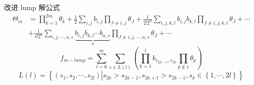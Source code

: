 \documentclass[handout]{beamer}
\newcommand{\sbrace}[1]{\left(#1\right)}
\newcommand{\bbrace}[1]{\left\{#1\right\}}
\begin{document}
\begin{frame}{改进 lump 解公式}
\begin{equation}
\begin{aligned}
\Theta_m&=\prod_{k=1}^{2m}\theta_k+\frac{1}{2}\sum_{i,j}{b_{i,j}}\prod_{J\neq i,j}{\theta_J}+\frac{1}{2! 2^2}\sum_{i,j,k,l}{b_{i,j}b_{k,l}}\prod_{J\neq i,j,k,l}{\theta_{J}}+\cdots \\
&+\frac{1}{s!2^s}\sum_{i,j,\cdots,u,v}\underbrace{{b_{i,j}b_{k,l}\cdots b_{u,v}}}_{s}\prod_{J\neq i,j,\cdots, u,v}{\theta_J}+\cdots 
\end{aligned}
\end{equation}
\pause 
\vfill
\begin{equation}
f_{m-lump}=\sum_{l=0}^m\sum_{s\in L(l)}\sbrace{\prod_{k=1}^l{b_{s_{2k-1},s_{2k}}}\prod_{p\not\in s}{\theta_p}}
\end{equation}
\begin{equation*}
  L(l)=\bbrace{\sbrace{s_1, s_2, \cdots ,s_{2l}}\left|s_{2k}>s_{2k-1},s_{2k+1}>s_{2k-1},s_k\in \bbrace{1,\cdots,2l}\right.}
\end{equation*}
\end{frame}
\end{document}
